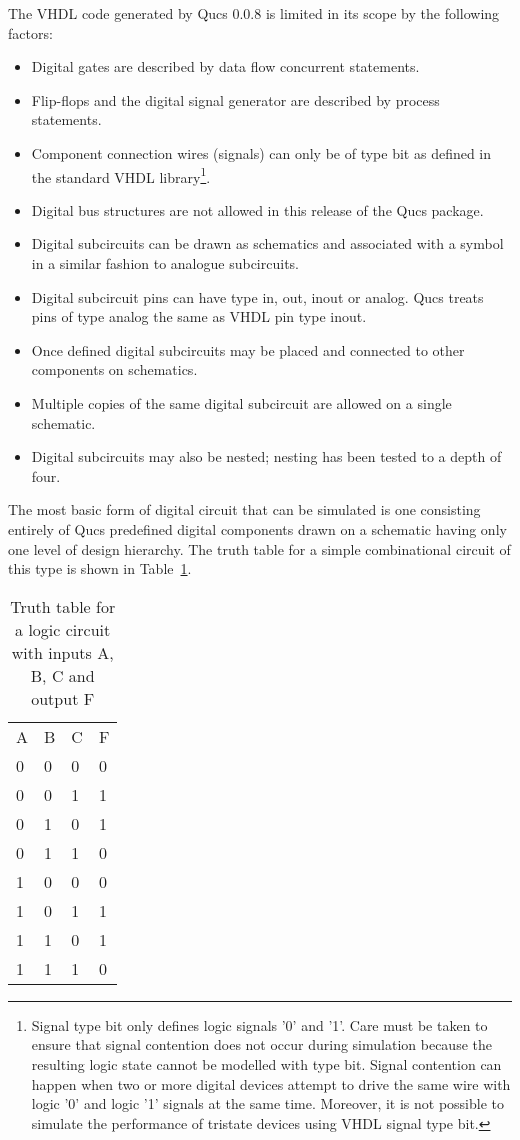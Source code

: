 \addvspace{12pt}

The VHDL code generated by Qucs 0.0.8 is limited in its scope by the
following factors:
\begin{itemize}
\item
Digital gates are described by data flow concurrent statements.
\item
Flip-flops and the digital signal generator are described by process
statements.
\item
Component connection wires (signals) can only be of type bit as
defined in the standard VHDL library\footnote{Signal type bit only
defines logic signals '0' and '1'.  Care must be taken to ensure that
signal contention does not occur during simulation because the
resulting logic state cannot be modelled with type bit. Signal
contention can happen when two or more digital devices attempt to
drive the same wire with logic '0' and logic '1' signals at the same
time.  Moreover, it is not possible to simulate the performance of
tristate devices using VHDL signal type bit.}.
\item
Digital bus structures are not allowed in this release of the Qucs
package.
\item
Digital subcircuits can be drawn as schematics and associated with a
symbol in a similar fashion to analogue subcircuits.
\item
Digital subcircuit pins can have type in, out, inout or analog.  Qucs
treats pins of type analog the same as VHDL pin type inout.
\item
Once defined digital subcircuits may be placed and connected to other
components on schematics.
\item
Multiple copies of the same digital subcircuit are allowed on a single
schematic.
\item
Digital subcircuits may also be nested; nesting has been tested to a
depth of four.


\end{itemize}


The most basic form of digital circuit that can be simulated is one
consisting entirely of Qucs predefined digital components drawn on a
schematic having only one level of design hierarchy.  The truth table
for a simple combinational circuit of this type is shown in
Table~\ref{tab:tab1}.

\begin{table}
\centering
\begin{tabular}{llll}
A & B & C & F \\ 
0 & 0 & 0 & 0 \\ 
0 & 0 & 1 & 1 \\ 
0 & 1 & 0 & 1 \\ 
0 & 1 & 1 & 0 \\ 
1 & 0 & 0 & 0 \\ 
1 & 0 & 1 & 1 \\ 
1 & 1 & 0 & 1 \\ 
1 & 1 & 1 & 0
\end{tabular}
\caption{Truth table for a logic circuit with inputs A, B, C and output F}
\label{tab:tab1}
\end{table}
\FloatBarrier

